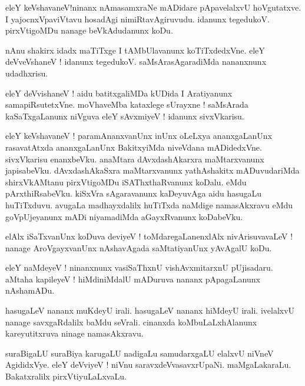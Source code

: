 \documentclass{article}
\begin{document}
\begin{mn}%
eleY keVshavaneV!ninanx nAmasamxraNe mADidare pApavelalxvU hoVgutatxve. I yajocnxVpaviVtavu 
hosadAgi nimiRtavAgiruvudu. idanunx tegedukoV. pirxVtigoMDu nanage beVkAdudanunx koDu.
\end{mn}

\begin{mn}%
nAnu shakirx idadx maTiTxge I tAMbUlavanunx koTiTxdedxVne. eleY deVveVshaneV ! idanunx tegedukoV. 
saMsArasAgaradiMda nananxnunx udadhxrisu.
\end{mn}

\begin{mn}%
eleY deVvishaneV ! aidu batitxgaliMDa kUDida I Aratiyanunx samapiRsutetxVne. moVhaveMba kataxlege 
sUrayxne ! saMsArada kaSaTxgaLanunx niVguva eleY sAvxmiyeV ! idanunx sivxVkarisu.
\end{mn}

\begin{mn}%
eleY keVshavaneV ! paramAnanxvanUnx inUnx oLeLxya ananxgaLanUnx rasavatAtxda ananxgaLanUnx 
BakitxyiMda niveVdana mADidedxVne. sivxVkarisu enanxbeVku. anaMtara dAvxdashAkarxra maMtarxvanunx 
japisabeVku. dAvxdashAkaSxra maMtarxvanunx yathAshakitx mADuvudariMda shirxVkAMtanu pirxVtigoMDu 
iSAThxthaRvanunx koDalu. eMdu pArxthiRsabeVku. kiSxVra sAgaravanunx kaDeyuvAga aidu hasugaLu 
huTiTxduvu. avugaLa madhayxdalilx huTiTxda naMdige namasAkxravu eMdu goVpUjeyanunx mADi 
niyamadiMda aGayxRvanunx koDabeVku.
\end{mn}

\begin{mn}%
elAlx iSaTxvanUnx koDuva deviyeV ! toMdaregaLanenxlAlx nivArisuvavaLeV ! nanage AroVgayxvanUnx 
nAshavAgada saMtatiyanUnx yAvAgalU koDu.
\end{mn}

\begin{mn}%
eleY naMdeyeV ! ninanxnunx vasiSaThxnU vishAvxmitarxnU pUjisadaru. aMtaha kapileyeV ! hiMdiniMdalU 
mADuruva nananx pApagaLanunx nAshamADu.
\end{mn}

\begin{mn}%
hasugaLeV nananx muKdeyU irali. hasugaLeV nananx hiMdeyU irali. ivelalxvU nanage savxgaRdalilx 
baMdu seVrali. cinanxda koMbuLaLxhAlanunx kareyutitxruva ninage namasAkxravu.
\end{mn}

\begin{mn}%
suraBigaLU suraBiya karugaLU nadigaLu samudarxgaLU elalxvU niVneV AgididxVye. eleY deVviyeV ! niVnu 
saravxdeVvasavxrUpaNi. maMgaLakaraLu. Bakatxralilx pirxVtiyuLaLxvaLu.
\end{mn}
\end{document}
